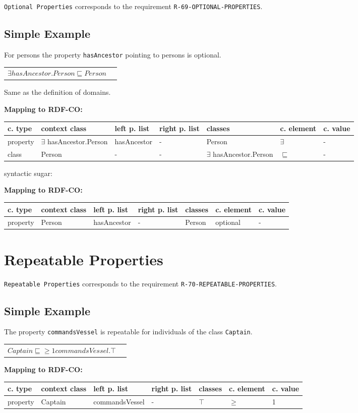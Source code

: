\documentclass{llncs}
\newcommand{\ms}[1]{\texttt{#1}}
\newenvironment{gcotable}{
  \scriptsize
  \sffamily
  \vspace{0cm}
	\begin{center}
	\textbf{\vspace{0.4cm}Mapping to RDF-CO:} \\
  \begin{tabular}{l|l|l|l|l|l|l}
	\hline
  \textbf{c. type} & \textbf{context class} & \textbf{left p. list} & \textbf{right p. list} & \textbf{classes} & \textbf{c. element} & \textbf{c. value} \\
  \hline

}{
  \hline
  \end{tabular}
	\end{center}
}
\newenvironment{DL}{
  \vspace{0cm}
	\begin{center}
  \begin{tabular}{r l}

}{
  \end{tabular}
	\end{center}
}
\begin{document}
\ms{Optional Properties} corresponds to the requirement \ms{R-69-OPTIONAL-PROPERTIES}.

\subsection{Simple Example}

For persons the property \ms{hasAncestor} pointing to persons is optional.

\begin{DL}
$\exists hasAncestor.Person \sqsubseteq Person$ \\
\end{DL}

Same as the definition of domains.

\begin{gcotable}
property & $\exists$ hasAncestor.Person & hasAncestor & - & Person & $\exists$ & - \\
class & Person & - & - & $\exists$ hasAncestor.Person & $\sqsubseteq$ & - \\
\end{gcotable}	

syntactic sugar:

\begin{gcotable}
property & Person & hasAncestor & - & Person & optional & - \\
\end{gcotable}

\section{Repeatable Properties}

\ms{Repeatable Properties} corresponds to the requirement \ms{R-70-REPEATABLE-PROPERTIES}.

\subsection{Simple Example}

The property \ms{commandsVessel} is repeatable for individuals of the class \ms{Captain}.

\begin{DL}
$Captain \sqsubseteq \geq1 commandsVessel.\top $
\end{DL}

\begin{gcotable}
property & Captain & commandsVessel & - & $\top$ & $\geq$ & 1 \\
\end{gcotable}
\end{document}
